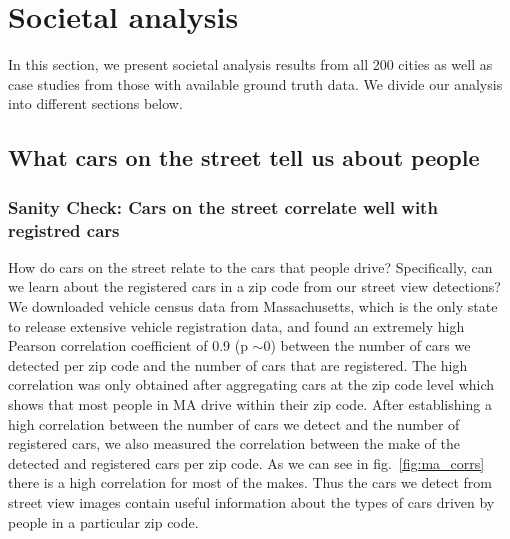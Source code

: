 \documentclass[10pt,twocolumn,letterpaper]{article}
\begin{document}
 \section{Societal analysis}
\label{sec:social}
In this section, we present societal analysis results from all 200 cities as well as case studies from those with available ground truth data. We divide our analysis into different sections below.

\subsection{What cars on the street tell us about people}
\subsubsection{Sanity Check: Cars on the street correlate well with registred cars}
How do cars on the street relate to the cars that people drive? Specifically, can we learn about the registered cars in a zip code from our street view detections?
We downloaded vehicle census data from Massachusetts, which is the only state to release extensive vehicle registration data, and found an extremely high Pearson correlation coefficient of 0.9 (p \(\sim\)0) between the number of cars we detected per zip code and the number of cars that are registered. The high correlation was only obtained after aggregating cars at the zip code level which shows that most people in MA drive within their zip code. 
After establishing a high correlation between the number of cars we detect and the number of registered cars, we also measured the correlation between the make of the detected and registered cars per zip code. As we can see in fig.~\ref{fig:ma_corrs} there is a high correlation for most of the makes. Thus the cars we detect from street view images contain useful information about the types of cars driven by people in a particular zip code.
\end{document}
